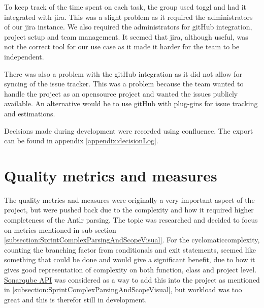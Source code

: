 To keep track of the time spent on each task, the group used \gls{toggl} and had it integrated with \gls{jira}. This was a slight problem as it required the administrators of our \gls{jira} instance. We also required the administrators for \Gls{git}Hub integration, project setup and team management. It seemed that \gls{jira}, although useful, was not the correct tool for our use case as it made it harder for the team to be independent.

There was also a problem with the \Gls{git}Hub integration as it did not allow for syncing of the issue tracker. This was a problem because the team wanted to handle the project as an \gls{opensource} project and wanted the issues publicly available. An alternative would be to use \Gls{git}Hub with plug-gins for issue tracking and estimations.

Decisions made during development were recorded using \gls{confluence}. The export can be found in appendix \ref{appendix:decisionLog}.

\section{Quality metrics and measures}
The quality metrics and measures were originally a very important aspect of the project, but were pushed back due to the complexity and how it required higher completeness of the Antlr parsing. The topic was researched and decided to focus on metrics mentioned in sub section \ref{subsection:SprintComplexParsingAndScopeVisual}.
For the \Gls{cyclomaticcomplexity}, counting the branching factor from conditionals and exit statements, seemed like something that could be done and would give a significant benefit, due to how it gives good representation of complexity on both function, class and project level. \href{https://github.com/SonarSource/sonarqube}{Sonarqube API} was considered as a way to add this into the project as mentioned in \ref{subsection:SprintComplexParsingAndScopeVisual}, but workload was too great and this is therefor still in development.

